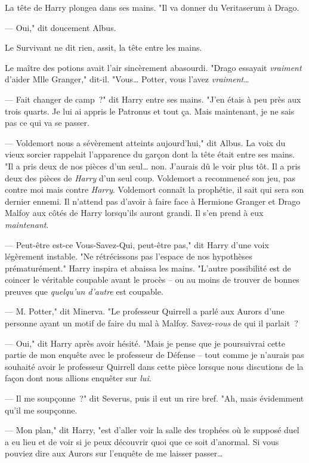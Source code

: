 La tête de Harry plongea dans ses mains. "Il va donner du Veritaserum à Drago.

--- Oui," dit doucement Albus.

Le Survivant ne dit rien, assit, la tête entre les mains.

Le maître des potions avait l'air sincèrement abasourdi. "Drago essayait \emph{vraiment} d'aider Mlle Granger," dit-il. "Vous… Potter, vous l'avez \emph{vraiment}…

--- Fait changer de camp~?" dit Harry entre ses mains. "J'en étais à peu près aux trois quarts. Je lui ai appris le Patronus et tout ça. Mais maintenant, je ne sais pas ce qui va se passer.

--- Voldemort nous a sévèrement atteints aujourd'hui," dit Albus. La voix du vieux sorcier rappelait l'apparence du garçon dont la tête était entre ses mains. "Il a pris deux de nos pièces d'un seul… non. J'aurais dû le voir plus tôt. Il a pris deux des pièces de \emph{Harry} d'un seul coup. Voldemort a recommencé son jeu, pas contre moi mais contre \emph{Harry}. Voldemort connaît la prophétie, il sait qui sera son dernier ennemi. Il n'attend pas d'avoir à faire face à Hermione Granger et Drago Malfoy aux côtés de Harry lorsqu'ils auront grandi. Il s'en prend à eux \emph{maintenant}.

--- Peut-être est-ce Vous-Savez-Qui, peut-être pas," dit Harry d'une voix légèrement instable. "Ne rétrécissons pas l'espace de nos hypothèses prématurément." Harry inspira et abaissa les mains. "L'autre possibilité est de coincer le véritable coupable avant le procès -- ou au moins de trouver de bonnes preuves que \emph{quelqu'un d'autre} est coupable.

--- M. Potter," dit Minerva. "Le professeur Quirrell a parlé aux Aurors d'une personne ayant un motif de faire du mal à Malfoy. Savez-\emph{vous} de qui il parlait~?

--- Oui," dit Harry après avoir hésité. "Mais je pense que je poursuivrai cette partie de mon enquête avec le professeur de Défense -- tout comme je n'aurais pas souhaité avoir le professeur Quirrell dans cette pièce lorsque nous discutions de la façon dont nous allions enquêter sur \emph{lui}.

--- Il me soupçonne~?" dit Severus, puis il eut un rire bref. "Ah, mais évidemment qu'il me soupçonne.

--- Mon plan," dit Harry, "est d'aller voir la salle des trophées où le supposé duel a eu lieu et de voir si je peux découvrir quoi que ce soit d'anormal. Si vous pouviez dire aux Aurors sur l'enquête de me laisser passer…

